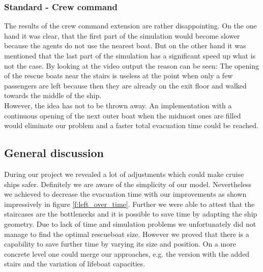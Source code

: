 \documentclass[11pt]{article}
\begin{document}
\subsubsection{Standard - Crew command}
The results of the crew command extension are rather disappointing. On the one hand it was clear, that the first part of the simulation would become slower because the agents do not use the nearest boat. But on the other hand it was mentioned that the last part of the simulation has a significant speed up what is not the case. By looking at the video output the reason can be seen: The opening of the rescue boats near the stairs is useless at the point when only a few passengers are left because then they are already on the exit floor and walked towards the middle of the ship.\\
However, the idea has not to be thrown away. An implementation with a continuous opening of the next outer boat when the midmost ones are filled would eliminate our problem and a faster total evacuation time could be reached.

\subsection{General discussion}

During our project we revealed a lot of adjustments which could make cruise ships safer. Definitely we are aware of the simplicity of our model. Nevertheless we achieved to decrease the evacuation time with our improvements as shown impressively in figure \ref{f:left_over_time}. Further we were able to attest that the staircases are the bottlenecks and it is possible to save time by adapting the ship geometry. Due to lack of time and simulation problems we unfortunately did not manage to find the optimal rescueboat size. However we proved that there is a capability to save further time by varying its size and position. On a more concrete level one could merge our approaches, e.g. the version with the added stairs and the variation of lifeboat capacities.
\end{document}
